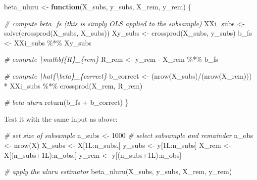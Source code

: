 \documentclass[
  12pt,
]{style/krantz}
\newenvironment{Shaded}{\begin{snugshade}}{\end{snugshade}}
\newcommand{\CommentTok}[1]{\textcolor[rgb]{0.56,0.35,0.01}{\textit{#1}}}
\newcommand{\ControlFlowTok}[1]{\textcolor[rgb]{0.13,0.29,0.53}{\textbf{#1}}}
\newcommand{\DecValTok}[1]{\textcolor[rgb]{0.00,0.00,0.81}{#1}}
\newcommand{\FunctionTok}[1]{\textcolor[rgb]{0.00,0.00,0.00}{#1}}
\newcommand{\NormalTok}[1]{#1}
\newcommand{\OtherTok}[1]{\textcolor[rgb]{0.56,0.35,0.01}{#1}}
\newcommand{\SpecialCharTok}[1]{\textcolor[rgb]{0.00,0.00,0.00}{#1}}
\begin{document}
\begin{Shaded}
\begin{Highlighting}[]
\NormalTok{beta\_uluru }\OtherTok{\textless{}{-}}
     \ControlFlowTok{function}\NormalTok{(X\_subs, y\_subs, X\_rem, y\_rem) \{}
          
          \CommentTok{\# compute beta\_fs (this is simply OLS applied to the subsample)}
\NormalTok{          XXi\_subs }\OtherTok{\textless{}{-}} \FunctionTok{solve}\NormalTok{(}\FunctionTok{crossprod}\NormalTok{(X\_subs, X\_subs))}
\NormalTok{          Xy\_subs }\OtherTok{\textless{}{-}} \FunctionTok{crossprod}\NormalTok{(X\_subs, y\_subs)}
\NormalTok{          b\_fs }\OtherTok{\textless{}{-}}\NormalTok{ XXi\_subs  }\SpecialCharTok{\%*\%}\NormalTok{ Xy\_subs}
          
          \CommentTok{\# compute \textbackslash{}mathbf\{R\}\_\{rem\}}
\NormalTok{          R\_rem }\OtherTok{\textless{}{-}}\NormalTok{ y\_rem }\SpecialCharTok{{-}}\NormalTok{ X\_rem }\SpecialCharTok{\%*\%}\NormalTok{ b\_fs}
          
          \CommentTok{\# compute \textbackslash{}hat\{\textbackslash{}beta\}\_\{correct\}}
\NormalTok{          b\_correct }\OtherTok{\textless{}{-}}\NormalTok{ (}\FunctionTok{nrow}\NormalTok{(X\_subs)}\SpecialCharTok{/}\NormalTok{(}\FunctionTok{nrow}\NormalTok{(X\_rem))) }\SpecialCharTok{*}\NormalTok{ XXi\_subs }\SpecialCharTok{\%*\%} \FunctionTok{crossprod}\NormalTok{(X\_rem, R\_rem)}

          \CommentTok{\# beta uluru       }
          \FunctionTok{return}\NormalTok{(b\_fs }\SpecialCharTok{+}\NormalTok{ b\_correct)}
\NormalTok{     \}}
\end{Highlighting}
\end{Shaded}

Test it with the same input as above:

\begin{Shaded}
\begin{Highlighting}[]
\CommentTok{\# set size of subsample}
\NormalTok{n\_subs }\OtherTok{\textless{}{-}} \DecValTok{1000}
\CommentTok{\# select subsample and remainder}
\NormalTok{n\_obs }\OtherTok{\textless{}{-}} \FunctionTok{nrow}\NormalTok{(X)}
\NormalTok{X\_subs }\OtherTok{\textless{}{-}}\NormalTok{ X[1L}\SpecialCharTok{:}\NormalTok{n\_subs,]}
\NormalTok{y\_subs }\OtherTok{\textless{}{-}}\NormalTok{ y[1L}\SpecialCharTok{:}\NormalTok{n\_subs]}
\NormalTok{X\_rem }\OtherTok{\textless{}{-}}\NormalTok{ X[(n\_subs}\SpecialCharTok{+}\NormalTok{1L)}\SpecialCharTok{:}\NormalTok{n\_obs,]}
\NormalTok{y\_rem }\OtherTok{\textless{}{-}}\NormalTok{ y[(n\_subs}\SpecialCharTok{+}\NormalTok{1L)}\SpecialCharTok{:}\NormalTok{n\_obs]}

\CommentTok{\# apply the uluru estimator}
\FunctionTok{beta\_uluru}\NormalTok{(X\_subs, y\_subs, X\_rem, y\_rem)}
\end{Highlighting}
\end{Shaded}
\end{document}
